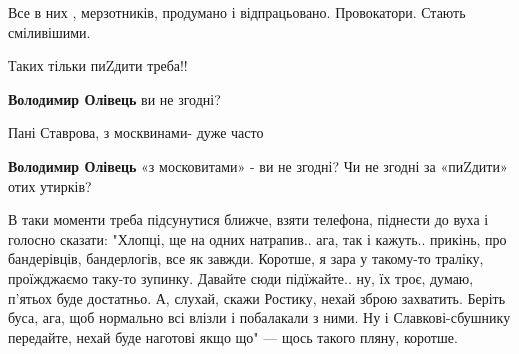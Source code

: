\begin{itemize}
Все в них , мерзотників, продумано і відпрацьовано. Провокатори. Стають сміливішими.

 
Таких тільки пиZдити треба!!

\begin{itemize}
 
\textbf{Володимир Олівець} ви не згодні?

 
Пані Ставрова, з москвинами- дуже часто

 
\textbf{Володимир Олівець} «з московитами» - ви не згодні? Чи не згодні за «пиZдити» отих утирків?
\end{itemize}

 

В таки моменти треба підсунутися ближче, взяти телефона, піднести до вуха і
голосно сказати: "Хлопці, ще на одних натрапив.. ага, так і кажуть.. прикінь,
про бандерівців, бандерлогів, все як завжди. Коротше, я зара у такому-то
траліку, проїжджаємо таку-то зупинку. Давайте сюди підїжайте.. ну, їх троє,
думаю, п'ятьох буде достатньо. А, слухай, скажи Ростику, нехай зброю захватить.
Беріть буса, ага, щоб нормально всі влізли і побалакали з ними. Ну і
Славкові-сбушнику передайте, нехай буде наготові якщо що" — щось такого пляну,
коротше.


\end{itemize}
